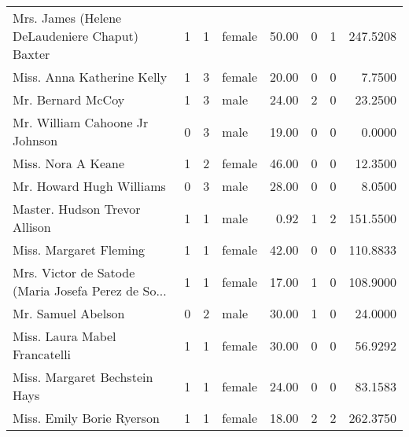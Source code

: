 \begin{tabular}{lrrlrrrr}
Mrs. James (Helene DeLaudeniere Chaput) Baxter     &         1 &       1 &  female &  50.00 &                        0 &                        1 &  247.5208 \\
Miss. Anna Katherine Kelly                         &         1 &       3 &  female &  20.00 &                        0 &                        0 &    7.7500 \\
Mr. Bernard McCoy                                  &         1 &       3 &    male &  24.00 &                        2 &                        0 &   23.2500 \\
Mr. William Cahoone Jr Johnson                     &         0 &       3 &    male &  19.00 &                        0 &                        0 &    0.0000 \\
Miss. Nora A Keane                                 &         1 &       2 &  female &  46.00 &                        0 &                        0 &   12.3500 \\
Mr. Howard Hugh Williams                           &         0 &       3 &    male &  28.00 &                        0 &                        0 &    8.0500 \\
Master. Hudson Trevor Allison                      &         1 &       1 &    male &   0.92 &                        1 &                        2 &  151.5500 \\
Miss. Margaret Fleming                             &         1 &       1 &  female &  42.00 &                        0 &                        0 &  110.8833 \\
Mrs. Victor de Satode (Maria Josefa Perez de So... &         1 &       1 &  female &  17.00 &                        1 &                        0 &  108.9000 \\
Mr. Samuel Abelson                                 &         0 &       2 &    male &  30.00 &                        1 &                        0 &   24.0000 \\
Miss. Laura Mabel Francatelli                      &         1 &       1 &  female &  30.00 &                        0 &                        0 &   56.9292 \\
Miss. Margaret Bechstein Hays                      &         1 &       1 &  female &  24.00 &                        0 &                        0 &   83.1583 \\
Miss. Emily Borie Ryerson                          &         1 &       1 &  female &  18.00 &                        2 &                        2 &  262.3750 \\

\end{tabular}
